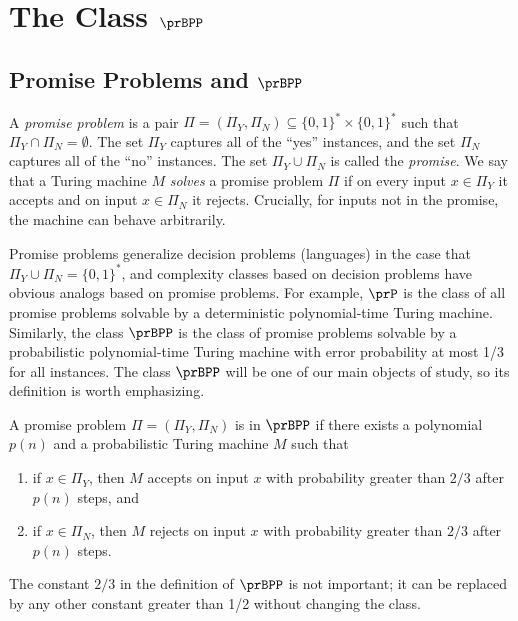\chapter{The Class \texorpdfstring{$\prBPP$}{prBPP}}
\label{lec:01}

\section{Promise Problems and \texorpdfstring{$\prBPP$}{prBPP}}

A \emph{promise problem} is a pair $\Pi = (\Pi_Y, \Pi_N) \subseteq \{0, 1\}^*
\times \{0, 1\}^*$ such that $\Pi_Y \cap \Pi_N = \emptyset$. The set $\Pi_Y$
captures all of the ``yes'' instances, and the set $\Pi_N$ captures all of the
``no'' instances. The set $\Pi_Y \cup \Pi_N$ is called the \emph{promise}. We
say that a Turing machine $M$ \emph{solves} a promise problem $\Pi$ if on
every input $x \in \Pi_Y$ it accepts and on input $x \in \Pi_N$ it rejects.
Crucially, for inputs not in the promise, the machine can behave arbitrarily.

Promise problems generalize decision problems (languages) in the case that
$\Pi_Y \cup \Pi_N = \{0,1\}^*$, and complexity classes based on decision
problems have obvious analogs based on promise problems. For example, $\prP$ is
the class of all promise problems solvable by a deterministic polynomial-time
Turing machine. Similarly, the class $\prBPP$ is the class of promise problems
solvable by a probabilistic polynomial-time Turing machine with error
probability at most 1/3 for all instances. The class $\prBPP$ will be one of
our main objects of study, so its definition is worth emphasizing.

\begin{definition}[$\prBPP$]
  A promise problem $\Pi = (\Pi_Y, \Pi_N)$ is in $\prBPP$ if there exists a
  polynomial $p(n)$ and a probabilistic Turing machine $M$ such that
  \begin{enumerate}
    \item if $x \in \Pi_Y$, then $M$ accepts on input $x$ with probability
      greater than $2/3$ after $p(n)$ steps, and
    \item if $x \in \Pi_N$, then $M$ rejects on input $x$ with probability
      greater than $2/3$ after $p(n)$ steps.
  \end{enumerate}
\end{definition}

The constant $2/3$ in the definition of $\prBPP$ is not important; it can be
replaced by any other constant greater than 1/2 without changing the class.

